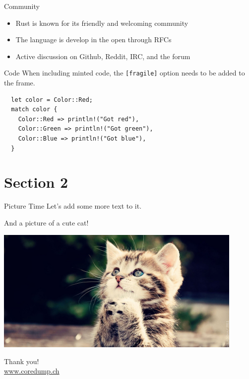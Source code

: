 \documentclass[aspectratio=1610,t]{beamer}
\begin{document}
\begin{frame}[c]{Community}
  \begin{itemize}
    \item Rust is known for its friendly and welcoming community
    \item The language is develop in the open through RFCs
    \item Active discussion on Github, Reddit, IRC, and the forum
  \end{itemize}
\end{frame}


\begin{frame}[fragile]{Code}
  When including minted code, the \texttt{[fragile]} option needs to be added to
  the frame.

  \begin{verbatim}
  let color = Color::Red;
  match color {
    Color::Red => println!("Got red"),
    Color::Green => println!("Got green"),
    Color::Blue => println!("Got blue"),
  }
  \end{verbatim}
\end{frame}


\section{Section 2}

\begin{frame}{Picture Time}
  Let's add some more text to it.

  And a picture of a cute cat!

  \includegraphics[height=6cm]{cat.jpg}
\end{frame}


{
\begin{frame}[standout]
  \begin{centering}
    {\Huge Thank you!}\\
    {\normalsize \url{www.coredump.ch}}\\
  \end{centering}
\end{frame}
}
\end{document}
